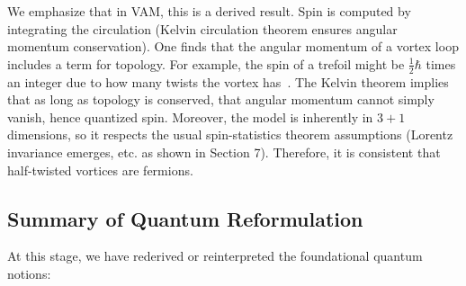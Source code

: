 \documentclass[a4paper,12pt]{article}
\begin{document}
    We emphasize that in VAM, this is a derived result. Spin is computed by integrating the circulation (Kelvin circulation theorem ensures angular momentum conservation). One finds that the angular momentum of a vortex loop includes a term for topology. For example, the spin of a trefoil might be $\frac{1}{2}\hbar$ times an integer due to how many twists the vortex has~\cite{reference_84}. The Kelvin theorem implies that as long as topology is conserved, that angular momentum cannot simply vanish, hence quantized spin. Moreover, the model is inherently in $3+1$ dimensions, so it respects the usual spin-statistics theorem assumptions (Lorentz invariance emerges, etc. as shown in Section 7). Therefore, it is consistent that half-twisted vortices are fermions.

    \subsection{Summary of Quantum Reformulation}
    At this stage, we have rederived or reinterpreted the foundational quantum notions:
\end{document}
